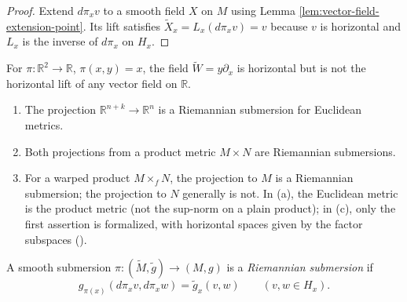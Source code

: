 \begin{proof}
\leanok
\sketch Extend $d\pi_xv$ to a smooth field $X$ on $M$ using Lemma \ref{lem:vector-field-extension-point}. Its lift satisfies $\tilde X_x=L_x(d\pi_xv)=v$ because $v$ is horizontal and $L_x$ is the inverse of $d\pi_x$ on $H_x$.
\end{proof}

\begin{proposition}
\label{prop:horizontal-vector-field-not-lift}
\leanok
{}
For $\pi:\mathbb R^2\to\mathbb R$, $\pi(x,y)=x$, the field
$\tilde W=y\partial_x$ is horizontal but is not the horizontal lift of any
vector field on $\mathbb R$.
\end{proposition}

\begin{example}
\label{ex:riemannian-submersions}
\leanok
{}
\begin{enumerate}
\item[(a)] The projection $\mathbb R^{n+k}\to\mathbb R^n$ is a Riemannian submersion for Euclidean metrics.
\item[(b)] Both projections from a product metric $M\times N$ are Riemannian submersions.
\item[(c)] For a warped product $M\times_fN$, the projection to $M$ is a Riemannian submersion; the projection to $N$ generally is not. In (a), the Euclidean metric is the product metric (not the sup-norm on a plain product); in (c), only the first assertion is formalized, with horizontal spaces given by the factor subspaces ().
\end{enumerate}
\end{example}

\begin{definition}
\label{def:riemannian-submersion}
\leanok
{}
A smooth submersion $\pi:(\tilde M,\tilde g)\to(M,g)$ is a \emph{Riemannian submersion} if
\[
g_{\pi(x)}(d\pi_xv,d\pi_xw)=\tilde g_x(v,w)\qquad(v,w\in H_x).
\]
\end{definition}

